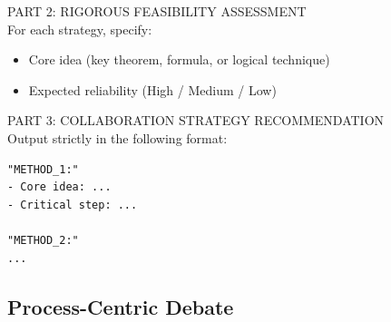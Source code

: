 \begin{tcolorbox}[
    breakable,
    colback=white,
    colframe=black,
    boxrule=0.8pt,
    left=6pt,
    right=6pt,
    top=6pt,
    bottom=6pt
]
\vspace{0.25em}
PART 2: RIGOROUS FEASIBILITY ASSESSMENT\\
For each strategy, specify:
\begin{itemize}
    \item Core idea (key theorem, formula, or logical technique)
    \item Expected reliability (High / Medium / Low)
\end{itemize}

\vspace{0.25em}
PART 3: COLLABORATION STRATEGY RECOMMENDATION\\
Output strictly in the following format:

\begin{verbatim}
"METHOD_1:"
- Core idea: ...
- Critical step: ...

"METHOD_2:"
...
\end{verbatim}
\end{tcolorbox}

\subsection{Process-Centric Debate}
\label{app:prompt_debate}

